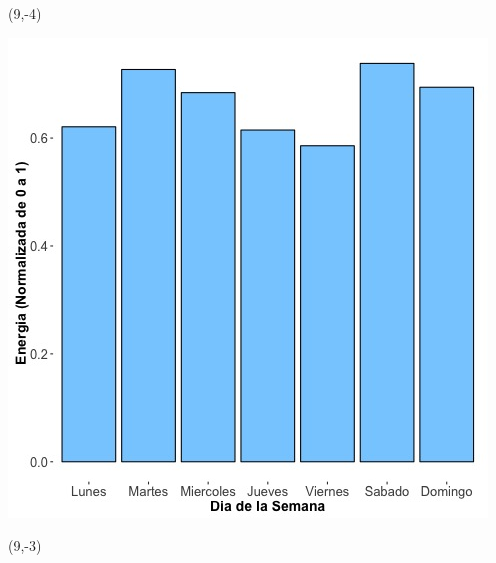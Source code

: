 \documentclass{article}\usepackage[]{graphicx}\usepackage[]{color}
\newenvironment{knitrout}{}{} %
\begin{document}
 \begin{textblock}{1}(9,-4)
\begin{minipage}{20em}
\begingroup

\endgroup
\end{minipage}
\end{textblock}


\begin{knitrout}
\color{fgcolor}
\includegraphics[scale=0.65]{figure/A24_day_of_week_plot} 
\end{knitrout}


 \begin{textblock}{1}(9,-3)
\begin{minipage}{20em}
\begingroup

\endgroup
\end{minipage}
\end{textblock}
\end{document}
